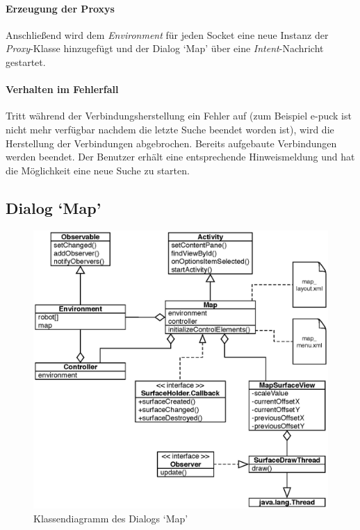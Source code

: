 \documentclass[10pt,a4paper]{article}
\begin{document}
	\paragraph*{Erzeugung der Proxys}
	Anschließend wird dem \textit{Environment} für jeden Socket eine neue Instanz der \textit{Proxy}-Klasse hinzugefügt und der Dialog `Map' über
	eine \textit{Intent}-Nachricht gestartet.
	
	\paragraph*{Verhalten im Fehlerfall}
	Tritt während der Verbindungsherstellung ein Fehler auf (zum Beispiel e-puck ist nicht mehr verfügbar nachdem die letzte Suche beendet worden
	ist), wird die Herstellung der Verbindungen abgebrochen. Bereits aufgebaute Verbindungen werden beendet. Der Benutzer erhält eine entsprechende
	Hinweismeldung und hat die Möglichkeit eine neue Suche zu starten.
	
	\subsection*{Dialog `Map'}
	
	\begin{figure}[h]
			\centering
			\includegraphics[width=14cm]{images/entwurf_map.eps}
  			\caption{Klassendiagramm des Dialogs `Map'}
  	\end{figure}
	
\end{document}
